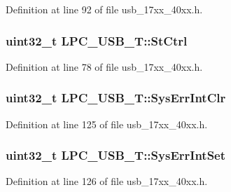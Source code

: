 Definition at line 92 of file usb\+\_\+17xx\+\_\+40xx.\+h.

\subsubsection[{\texorpdfstring{St\+Ctrl}{StCtrl}}]{ uint32\+\_\+t L\+P\+C\+\_\+\+U\+S\+B\+\_\+\+T\+::\+St\+Ctrl}\hypertarget{structLPC__USB__T_ac85c94aa8644425eda67dc8cea4412ff}{}\label{structLPC__USB__T_ac85c94aa8644425eda67dc8cea4412ff}


Definition at line 78 of file usb\+\_\+17xx\+\_\+40xx.\+h.

\subsubsection[{\texorpdfstring{Sys\+Err\+Int\+Clr}{SysErrIntClr}}]{ uint32\+\_\+t L\+P\+C\+\_\+\+U\+S\+B\+\_\+\+T\+::\+Sys\+Err\+Int\+Clr}\hypertarget{structLPC__USB__T_a7b1d9aab93cf9059d9b9e9103c79d4ee}{}\label{structLPC__USB__T_a7b1d9aab93cf9059d9b9e9103c79d4ee}


Definition at line 125 of file usb\+\_\+17xx\+\_\+40xx.\+h.

\subsubsection[{\texorpdfstring{Sys\+Err\+Int\+Set}{SysErrIntSet}}]{ uint32\+\_\+t L\+P\+C\+\_\+\+U\+S\+B\+\_\+\+T\+::\+Sys\+Err\+Int\+Set}\hypertarget{structLPC__USB__T_a2fab0c11e608a1acee0fada1c99ad9ee}{}\label{structLPC__USB__T_a2fab0c11e608a1acee0fada1c99ad9ee}


Definition at line 126 of file usb\+\_\+17xx\+\_\+40xx.\+h.

